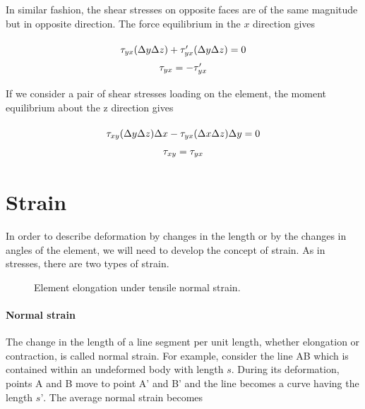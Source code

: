 \documentclass[
10pt,
a4paper,
openany,
svgnames,
]{book} %
\begin{document}
In similar fashion, the shear stresses on opposite faces are of the same magnitude but in opposite direction.
The force equilibrium in the $x$ direction gives

\begin{equation}
  \arraycolsep=1.4pt\def\arraystretch{1.5}
  \begin{array}{c}
    {\tau _{yx}}(\Delta y\Delta z) + {\tau_{yx}'}(\Delta y\Delta z) = 0\\
    {\tau _{yx}} =  - {\tau_{yx}'}
  \end{array}
\end{equation}

If we consider a pair of shear stresses loading on the element, the moment equilibrium about the z direction gives

\begin{equation}
  \arraycolsep=1.4pt\def\arraystretch{1.5}
  \begin{array}{c}
    {\tau _{xy}}(\Delta y\Delta z)\Delta x - {\tau _{yx}}(\Delta x\Delta z)\Delta y = 0\\
    {\tau _{xy}} = {\tau _{yx}}
  \end{array}
\end{equation}

\section{Strain}

In order to describe deformation by changes in the length or by the changes in angles of the element, we will need to develop the concept of strain. As in stresses, there are two types of strain.

\begin{figure}[h]
  \centering
  \caption{Element elongation under tensile normal strain.}
\end{figure}

\paragraph{Normal strain} The change in the length of a line segment per unit length, whether elongation or contraction, is called normal strain. For example, consider the line AB which is contained within an undeformed body with length $s$. During its deformation, points A and B move to point A’ and B’ and the line becomes a curve having the length $s’$. The average normal strain becomes
\end{document}
